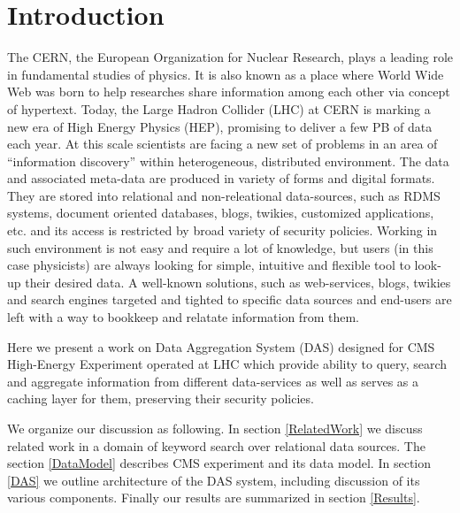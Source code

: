 \documentclass[a4paper]{jpconf}
\begin{document}
\newpage

\section{Introduction}
The CERN, the European Organization for Nuclear Research, plays a leading
role in fundamental studies of physics. It is also known as a place where
World Wide Web was born to help researches share information among each other
via concept of hypertext.
Today, the Large Hadron Collider (LHC) at CERN is marking a new era of High Energy
Physics (HEP), promising to deliver a few PB of data each year. 
At this scale scientists are facing a new set of problems in an area of
``information discovery'' within heterogeneous, distributed environment.
The data and associated meta-data are produced in variety of forms and digital formats.
They are stored into relational and non-releational data-sources, such as 
RDMS systems, document oriented databases, blogs, twikies, customized applications, etc. 
and its access is restricted by broad variety of security policies. 
Working in such environment is not easy and require a lot of knowledge, but users
(in this case physicists) are always looking for simple, intuitive and flexible
tool to look-up their desired data. A well-known solutions, such as web-services,
blogs, twikies and search engines targeted and tighted to specific data
sources and end-users are left with a way to bookkeep and relatate information
from them.

Here we present a work on Data Aggregation System (DAS) designed for
CMS High-Energy Experiment operated at LHC which provide
ability to query, search and aggregate information from different 
data-services as well as serves as a caching layer for them, 
preserving their security policies. 

We organize
our discussion as following. In section \ref{RelatedWork} we discuss
related work in a domain of keyword search over relational data sources.
The section \ref{DataModel} describes CMS experiment and its data model. In section
\ref{DAS} we outline architecture of the DAS system, including discussion of its
various components. Finally our results are summarized in section \ref{Results}.

\end{document}
